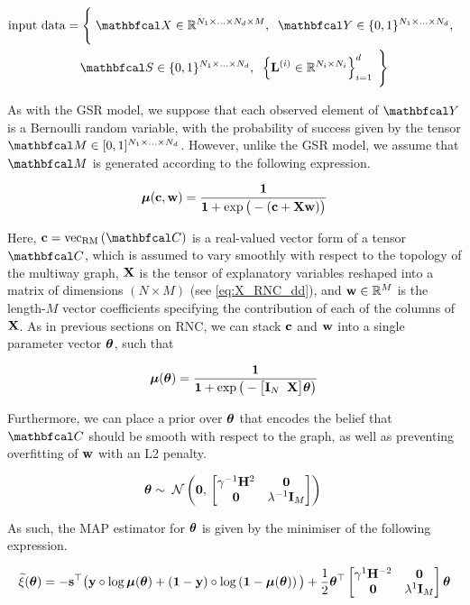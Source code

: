 \begin{multline*}
    \text{input data} = \Bigg\{\;\Xt \in \R^{N_1 \times ... \times N_d \times M}, \;\; \Yt \in \{0, 1\}^{N_1 \times ... \times N_d}, \;\; \\ 
    \St \in \{0, 1\}^{N_1 \times ... \times N_d} , \;\; \left\{\LL^{(i)} \in \R^{N_i \times N_i}\right\}_{i=1}^d \; \Bigg\}
\end{multline*}

As with the GSR model, we suppose that each observed element of $\Yt$ is a Bernoulli random variable, with the probability of success given by the tensor $\Mt \in [0, 1]^{N_1 \times ... \times N_d}$. However, unlike the GSR model, we assume that $\Mt$ is generated according to the following expression. 

\begin{equation}
    \boldsymbol{\mu}(\mathbf{c}, \mathbf{w}) = \frac{\mathbf{1}}{\mathbf{1} + \exp\big(-(\mathbf{c} + \mathbf{X} \mathbf{w}) \big)}
\end{equation}

Here, $\cc = \vecrm{\Ct}$ is a real-valued vector form of a tensor $\Ct$, which is assumed to vary smoothly with respect to the topology of the multiway graph, $\mathbf{X}$ is the tensor of explanatory variables reshaped into a matrix of dimensions $(N \times M)$ (see \cref{eq:X_RNC_dd}), and $\mathbf{w} \in \mathbb{R}^M$ is the length-$M$ vector coefficients specifying the contribution of each of the columns of $\mathbf{X}$. As in previous sections on RNC, we can stack $\mathbf{c}$ and $\mathbf{w}$ into a single parameter vector $\boldsymbol{\theta}$, such that 

\begin{equation}
    \boldsymbol{\mu}(\boldsymbol{\theta}) = \frac{\mathbf{1}}{\mathbf{1} + \exp\big(-\big[\mathbf{I}_N \;\; \mathbf{X} \big] \boldsymbol{\theta} \big)}
\end{equation}

Furthermore, we can place a prior over $\boldsymbol{\theta}$ that encodes the belief that $\Ct$ should be smooth with respect to the graph, as well as preventing overfitting of $\mathbf{w}$ with an L2 penalty. 

\begin{equation}
    \boldsymbol{\theta} \sim \; \mathcal{N}\left(\mathbf{0}, \, \begin{bmatrix}\gamma^{-1} \mathbf{H}^2 & \mathbf{0} \\
    \mathbf{0} & \lambda^{-1} \mathbf{I}_M \end{bmatrix}\right) \;
\end{equation}

As such, the MAP estimator for $\boldsymbol{\theta}$ is given by the minimiser of the following expression. 

\begin{equation}
    \label{eq:nll_logistic_rnc}
    \widetilde{\xi}(\boldsymbol{\theta}) = -\mathbf{s}^\top \big(\mathbf{y} \circ \log \boldsymbol{\mu}(\boldsymbol{\theta}) + \left(\mathbf{1}  - \mathbf{y}\right) \circ \log \left(\mathbf{1} - \boldsymbol{\mu}(\boldsymbol{\theta}) \right)\big) + \frac{1}{2} \boldsymbol{\theta}^\top \begin{bmatrix}\gamma^{1} \mathbf{H}^{-2} & \mathbf{0} \\
        \mathbf{0} & \lambda^{1} \mathbf{I}_M \end{bmatrix}\boldsymbol{\theta}
\end{equation}

